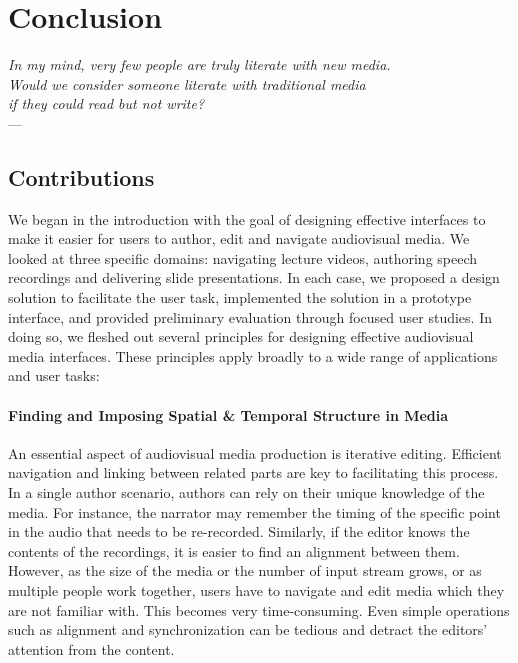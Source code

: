 
\chapter{Conclusion} 
\label{ch:conclusion} %
%
\begin{flushright}{\slshape    
In my mind, very few people are truly literate with new media.\\
Would we consider someone literate with traditional media\\
if they could read but not write?} \\ \medskip
---  \citep{resnick:2008}
\end{flushright}
%
\section{Contributions}
We began in the introduction with the goal of designing effective interfaces to make it easier for users to author, edit and navigate audiovisual media. We looked at three specific domains: navigating lecture videos, authoring speech recordings and delivering slide presentations. In each case, we proposed a design solution to facilitate the user task, implemented the solution in a prototype interface, and provided preliminary evaluation through focused user studies. In doing so, we fleshed out several principles for designing effective audiovisual media interfaces. These principles apply broadly to a wide range of applications and user tasks:

\subsubsection{Finding and Imposing Spatial \& Temporal Structure in Media}
An essential aspect of audiovisual media production is iterative editing. Efficient navigation and linking between related parts are key to facilitating this process.\\

In a single author scenario, authors can rely on their unique knowledge of the media. For instance, the narrator may remember the timing of the specific point in the audio that needs to be re-recorded. Similarly, if the editor knows the contents of the recordings, it is easier to find an alignment between them. However, as the size of the media or the number of input stream grows, or as multiple people work together, users have to navigate and edit media which they are not familiar with. This becomes very time-consuming. Even simple operations such as alignment and synchronization can be tedious and detract the editors' attention from the content.\\

